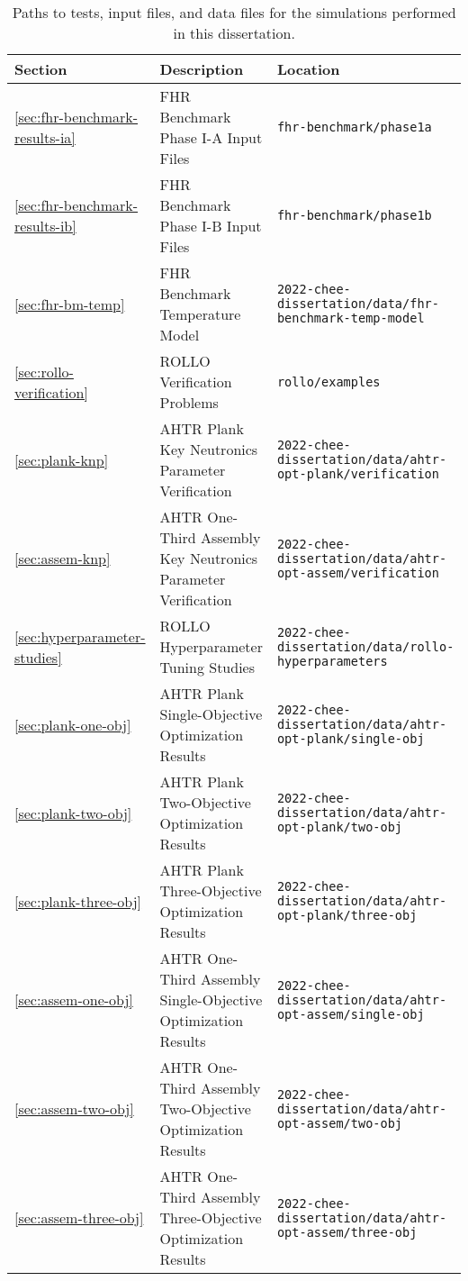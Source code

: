\begin{landscape}
\begin{table}[htbp!]
    \centering
    \onehalfspacing
    \caption{Paths to tests, input files, and data files for the simulations performed 
    in this dissertation. }
    \label{tab:reproducibility}
    \begin{tabular}{p{2cm}p{9cm}p{11cm}}
    \toprule
    \textbf{Section} & \textbf{Description} & \textbf{Location} \\
    \midrule
    \ref{sec:fhr-benchmark-results-ia} & FHR Benchmark Phase I-A Input Files & 
    \texttt{fhr-benchmark/phase1a} \\ 
    \midrule
    \ref{sec:fhr-benchmark-results-ib} & FHR Benchmark Phase I-B Input Files & 
    \texttt{fhr-benchmark/phase1b} \\ 
    \midrule
    \ref{sec:fhr-bm-temp} & FHR Benchmark Temperature Model & 
    \texttt{2022-chee-dissertation/data/fhr-benchmark-temp-model} \\ 
    \midrule
    \ref{sec:rollo-verification} & ROLLO Verification Problems & 
    \texttt{rollo/examples} \\ 
    \midrule
    \ref{sec:plank-knp} & AHTR Plank Key Neutronics Parameter Verification & 
    \texttt{2022-chee-dissertation/data/ahtr-opt-plank/verification} \\
    \midrule
    \ref{sec:assem-knp} & AHTR One-Third Assembly Key Neutronics Parameter Verification & 
    \texttt{2022-chee-dissertation/data/ahtr-opt-assem/verification} \\
    \midrule
    \ref{sec:hyperparameter-studies} & ROLLO Hyperparameter Tuning Studies & 
    \texttt{2022-chee-dissertation/data/rollo-hyperparameters} \\
    \midrule
    \ref{sec:plank-one-obj} & AHTR Plank Single-Objective Optimization Results & 
    \texttt{2022-chee-dissertation/data/ahtr-opt-plank/single-obj} \\
    \midrule
    \ref{sec:plank-two-obj} & AHTR Plank Two-Objective Optimization Results & 
    \texttt{2022-chee-dissertation/data/ahtr-opt-plank/two-obj} \\
    \midrule
    \ref{sec:plank-three-obj} & AHTR Plank Three-Objective Optimization Results & 
    \texttt{2022-chee-dissertation/data/ahtr-opt-plank/three-obj} \\
    \midrule
    \ref{sec:assem-one-obj} & AHTR One-Third Assembly Single-Objective Optimization Results & 
    \texttt{2022-chee-dissertation/data/ahtr-opt-assem/single-obj} \\
    \midrule
    \ref{sec:assem-two-obj} & AHTR One-Third Assembly Two-Objective Optimization Results & 
    \texttt{2022-chee-dissertation/data/ahtr-opt-assem/two-obj} \\
    \midrule
    \ref{sec:assem-three-obj} & AHTR One-Third Assembly Three-Objective Optimization Results & 
    \texttt{2022-chee-dissertation/data/ahtr-opt-assem/three-obj} \\
    \bottomrule
    \end{tabular}
\end{table}
\end{landscape}